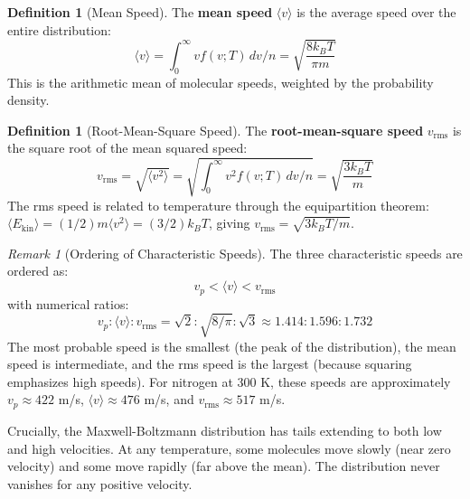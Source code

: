 \documentclass[12pt,a4paper]{article}
\theoremstyle{definition}
\newtheorem{definition}[theorem]{Definition}
\theoremstyle{remark}
\newtheorem{remark}[theorem]{Remark}
\begin{document}
\begin{definition}[Mean Speed]
\label{def:mean_speed}
The \textbf{mean speed} $\langle v \rangle$ is the average speed over the entire distribution:
\begin{equation}
\langle v \rangle = \int_0^\infty v f(v; T) \, dv / n = \sqrt{\frac{8k_B T}{\pi m}}
\label{eq:mean_speed}
\end{equation}
This is the arithmetic mean of molecular speeds, weighted by the probability density.
\end{definition}

\begin{definition}[Root-Mean-Square Speed]
\label{def:rms_speed}
The \textbf{root-mean-square speed} $v_{\text{rms}}$ is the square root of the mean squared speed:
\begin{equation}
v_{\text{rms}} = \sqrt{\langle v^2 \rangle} = \sqrt{\int_0^\infty v^2 f(v; T) \, dv / n} = \sqrt{\frac{3k_B T}{m}}
\label{eq:rms_speed}
\end{equation}
The rms speed is related to temperature through the equipartition theorem: $\langle E_{\text{kin}} \rangle = (1/2) m \langle v^2 \rangle = (3/2) k_B T$, giving $v_{\text{rms}} = \sqrt{3k_B T / m}$.
\end{definition}

\begin{remark}[Ordering of Characteristic Speeds]
\label{rem:speed_ordering}
The three characteristic speeds are ordered as:
\begin{equation}
v_p < \langle v \rangle < v_{\text{rms}}
\end{equation}
with numerical ratios:
\begin{equation}
v_p : \langle v \rangle : v_{\text{rms}} = \sqrt{2} : \sqrt{8/\pi} : \sqrt{3} \approx 1.414 : 1.596 : 1.732
\end{equation}
The most probable speed is the smallest (the peak of the distribution), the mean speed is intermediate, and the rms speed is the largest (because squaring emphasizes high speeds). For nitrogen at 300 K, these speeds are approximately $v_p \approx 422$ m/s, $\langle v \rangle \approx 476$ m/s, and $v_{\text{rms}} \approx 517$ m/s.
\end{remark}

Crucially, the Maxwell-Boltzmann distribution has tails extending to both low and high velocities. At any temperature, some molecules move slowly (near zero velocity) and some move rapidly (far above the mean). The distribution never vanishes for any positive velocity.
\end{document}
